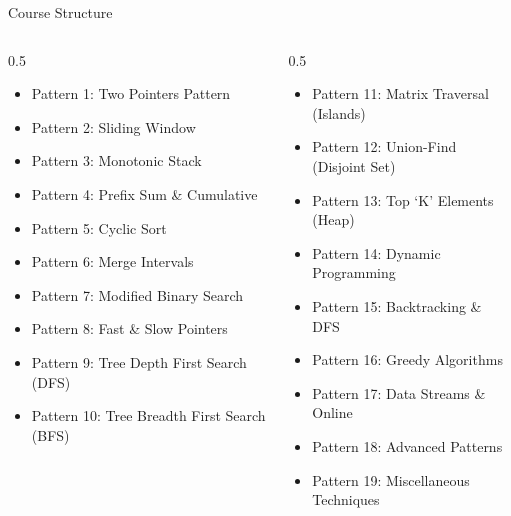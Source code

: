 \begin{frame}{Course Structure}
  \scriptsize
  \begin{columns}[t]
    \begin{column}{0.5\textwidth}
      \begin{itemize}
        \item Pattern 1: Two Pointers Pattern
        \item Pattern 2: Sliding Window
        \item Pattern 3: Monotonic Stack
        \item Pattern 4: Prefix Sum \& Cumulative
        \item Pattern 5: Cyclic Sort
        \item Pattern 6: Merge Intervals
        \item Pattern 7: Modified Binary Search
        \item Pattern 8: Fast \& Slow Pointers
        \item Pattern 9: Tree Depth First Search (DFS)
        \item Pattern 10: Tree Breadth First Search (BFS)
      \end{itemize}
    \end{column}
    \begin{column}{0.5\textwidth}
      \begin{itemize}
        \item Pattern 11: Matrix Traversal (Islands)
        \item Pattern 12: Union-Find (Disjoint Set)
        \item Pattern 13: Top `K' Elements (Heap)
        \item Pattern 14: Dynamic Programming
        \item Pattern 15: Backtracking \& DFS
        \item Pattern 16: Greedy Algorithms
        \item Pattern 17: Data Streams \& Online
        \item Pattern 18: Advanced Patterns
        \item Pattern 19: Miscellaneous Techniques
      \end{itemize}
    \end{column}
  \end{columns}
\end{frame}